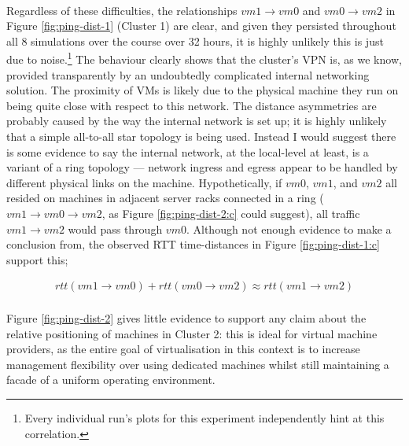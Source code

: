 \documentclass[a4paper,10pt]{article}
\begin{document}
\paragraph{} Regardless of these difficulties, the relationships $vm1 \rightarrow vm0$ and $vm0 \rightarrow vm2$ in Figure \ref{fig:ping-dist-1} (Cluster 1) are clear, and given they persisted throughout all 8 simulations over the course over 32 hours, it is highly unlikely this is just due to noise.\footnote{Every individual run's plots for this experiment independently hint at this correlation.} The behaviour clearly shows that the cluster's VPN is, as we know, provided transparently by an undoubtedly complicated internal networking solution. The proximity of VMs is likely due to the physical machine they run on being quite close with respect to this network. The distance asymmetries are probably caused by the way the internal network is set up; it is highly unlikely that a simple all-to-all star topology is being used. Instead I would suggest there is some evidence to say the internal network, at the local-level at least, is a variant of a ring topology --- network ingress and egress appear to be handled by different physical links on the machine. Hypothetically, if $vm0$, $vm1$, and $vm2$ all resided on machines in adjacent server racks connected in a ring ($vm1 \rightarrow vm0 \rightarrow vm2$, as Figure \ref{fig:ping-dist-2:c} could suggest), all traffic $vm1 \rightarrow vm2$ would pass through $vm0$. Although not enough evidence to make a conclusion from, the observed RTT time-distances in Figure \ref{fig:ping-dist-1:c} support this;

\vspace{-3mm}
\begin{align*}
    rtt(vm1 \rightarrow vm0) + rtt(vm0 \rightarrow vm2) \approx rtt(vm1 \rightarrow vm2)
\end{align*}

\paragraph{} Figure \ref{fig:ping-dist-2} gives little evidence to support any claim about the relative positioning of machines in Cluster 2: this is ideal for virtual machine providers, as the entire goal of virtualisation in this context is to increase management flexibility over using dedicated machines whilst still maintaining a facade of a uniform operating environment.
\end{document}
